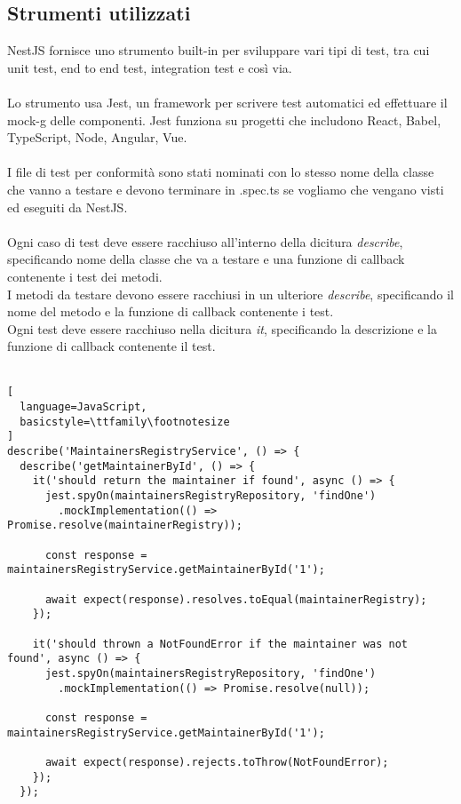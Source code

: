 \subsection{Strumenti utilizzati}
NestJS fornisce uno strumento built-in per sviluppare vari tipi di test, tra cui unit test, 
end to end test, integration test e così via. 
\\\\
Lo strumento usa Jest, un framework per scrivere test automatici ed effettuare 
il \gls{mock-g} delle componenti. Jest funziona su progetti che includono  React, Babel, TypeScript, Node,
Angular, Vue.
\\\\
I file di test per conformità sono stati nominati con lo stesso nome della classe che vanno
a testare e devono terminare in .spec.ts se vogliamo che vengano visti ed eseguiti da NestJS.
\\\\
Ogni caso di test deve essere racchiuso all'interno della dicitura \textit{describe}, specificando nome della
classe che va a testare e una funzione di callback contenente i test dei metodi.
\\
I metodi da testare devono essere racchiusi in un ulteriore \textit{describe}, specificando il nome
del metodo e la funzione di callback contenente i test.
\\
Ogni test deve essere racchiuso nella dicitura \textit{it}, specificando la descrizione e la funzione 
di callback contenente il test.
\\\\
\begin{lstlisting}[
  language=JavaScript,
  basicstyle=\ttfamily\footnotesize
]
describe('MaintainersRegistryService', () => {
  describe('getMaintainerById', () => {
    it('should return the maintainer if found', async () => {
      jest.spyOn(maintainersRegistryRepository, 'findOne')
        .mockImplementation(() => Promise.resolve(maintainerRegistry));

      const response = maintainersRegistryService.getMaintainerById('1');

      await expect(response).resolves.toEqual(maintainerRegistry);
    });

    it('should thrown a NotFoundError if the maintainer was not found', async () => {
      jest.spyOn(maintainersRegistryRepository, 'findOne')
        .mockImplementation(() => Promise.resolve(null));

      const response = maintainersRegistryService.getMaintainerById('1');

      await expect(response).rejects.toThrow(NotFoundError);
    });
  });
\end{lstlisting}

